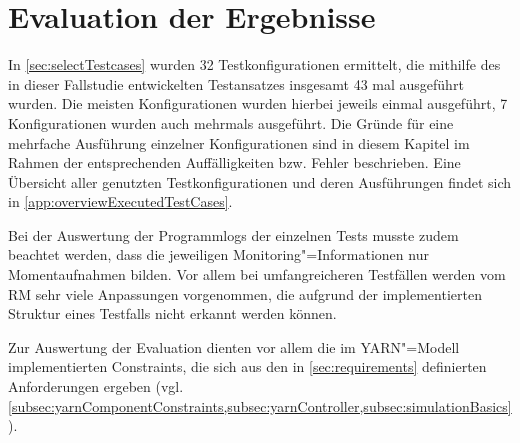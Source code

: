 \chapter{Evaluation der Ergebnisse}
\label{ch:evaluationResults}

In \cref{sec:selectTestcases} wurden 32 Testkonfigurationen ermittelt, die mithilfe des in dieser Fallstudie entwickelten Testansatzes insgesamt 43 mal ausgeführt wurden.
Die meisten Konfigurationen wurden hierbei jeweils einmal ausgeführt, 7 Konfigurationen wurden auch mehrmals ausgeführt.
Die Gründe für eine mehrfache Ausführung einzelner Konfigurationen sind in diesem Kapitel im Rahmen der entsprechenden Auffälligkeiten bzw. Fehler beschrieben.
Eine Übersicht aller genutzten Testkonfigurationen und deren Ausführungen findet sich in \cref{app:overviewExecutedTestCases}.

Bei der Auswertung der Programmlogs der einzelnen Tests musste zudem beachtet werden, dass die jeweiligen Monitoring"=Informationen nur Momentaufnahmen bilden.
Vor allem bei umfangreicheren Testfällen werden vom \gls{RM} sehr viele Anpassungen vorgenommen, die aufgrund der implementierten Struktur eines Testfalls nicht erkannt werden können.

Zur Auswertung der Evaluation dienten vor allem die im YARN"=Modell implementierten Constraints, die sich aus den in \cref{sec:requirements} definierten Anforderungen ergeben (vgl. \cref{subsec:yarnComponentConstraints,subsec:yarnController,subsec:simulationBasics}).
















